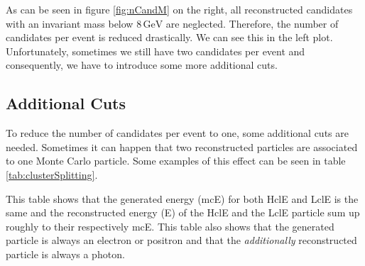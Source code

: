 \documentclass[a4paper,11pt,twosided,final,german,openbib,pdftex,listof=totoc,bibliography=totoc]{scrbook}
\begin{document}
As can be seen in figure \ref{fig:nCandM} on the right, all reconstructed candidates with an invariant mass below $8\,\textrm{GeV}$ are neglected. Therefore, the number of candidates per event is reduced drastically. We can see this in the left plot. Unfortunately, sometimes we still have two candidates per event and consequently, we have to introduce some more additional cuts.



\subsection{Additional Cuts}

To reduce the number of candidates per event to one, some additional cuts are needed. Sometimes it can happen that two reconstructed particles are associated to one Monte Carlo particle. Some examples of this effect can be seen in table \ref{tab:clusterSplitting}. 


\begin{table}[h!]
	\centering
	\caption[Cluster Splitting Examples]{Some examples for events with cluster splitting. mcE is the same for LclE and HclE. The energies are in GeV. }
	\label{tab:clusterSplitting}
\end{table}

This table shows that the generated energy (mcE) for both HclE and LclE is the same and the reconstructed energy (E) of the HclE and the LclE particle sum up roughly to their respectively mcE. 
This table also shows that the generated particle is always an electron or positron and that the \textit{additionally} reconstructed particle is always a photon.
\end{document}
